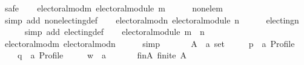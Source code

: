 \begin{isabellebody}
\ {\isacharparenleft}{\kern0pt}safe{\isacharparenright}{\kern0pt}\isanewline
\ \ \isamarkupfalse%
\ electoral{\isacharunderscore}{\kern0pt}mod{\isacharunderscore}{\kern0pt}m{\isacharcolon}{\kern0pt}\ {\isachardoublequoteopen}electoral{\isacharunderscore}{\kern0pt}module\ m{\isachardoublequoteclose}\isanewline
\ \ \ \ \isamarkupfalse%
\ non{\isacharunderscore}{\kern0pt}ele{\isacharunderscore}{\kern0pt}m\isanewline
\ \ \ \ \isamarkupfalse%
\ {\isacharparenleft}{\kern0pt}simp\ add{\isacharcolon}{\kern0pt}\ non{\isacharunderscore}{\kern0pt}electing{\isacharunderscore}{\kern0pt}def{\isacharparenright}{\kern0pt}\isanewline
\ \ \isamarkupfalse%
\ electoral{\isacharunderscore}{\kern0pt}mod{\isacharunderscore}{\kern0pt}n{\isacharcolon}{\kern0pt}\ {\isachardoublequoteopen}electoral{\isacharunderscore}{\kern0pt}module\ n{\isachardoublequoteclose}\isanewline
\ \ \ \ \isamarkupfalse%
\ electing{\isacharunderscore}{\kern0pt}n\isanewline
\ \ \ \ \isamarkupfalse%
\ {\isacharparenleft}{\kern0pt}simp\ add{\isacharcolon}{\kern0pt}\ electing{\isacharunderscore}{\kern0pt}def{\isacharparenright}{\kern0pt}\isanewline
\ \ \isamarkupfalse%
\ {\isachardoublequoteopen}electoral{\isacharunderscore}{\kern0pt}module\ {\isacharparenleft}{\kern0pt}m\ {\isasymtriangleright}\ n{\isacharparenright}{\kern0pt}{\isachardoublequoteclose}\isanewline
\ \ \ \ \isamarkupfalse%
\ electoral{\isacharunderscore}{\kern0pt}mod{\isacharunderscore}{\kern0pt}m\ electoral{\isacharunderscore}{\kern0pt}mod{\isacharunderscore}{\kern0pt}n\isanewline
\ \ \ \ \isamarkupfalse%
\ simp\isanewline
{}\isamarkupfalse%
\isanewline
\ \ \isamarkupfalse%
\isanewline
\ \ \ \ A\ {\isacharcolon}{\kern0pt}{\isacharcolon}{\kern0pt}\ {\isachardoublequoteopen}{\isacharprime}{\kern0pt}a\ set{\isachardoublequoteclose}\ \isanewline
\ \ \ \ p\ {\isacharcolon}{\kern0pt}{\isacharcolon}{\kern0pt}\ {\isachardoublequoteopen}{\isacharprime}{\kern0pt}a\ Profile{\isachardoublequoteclose}\ \isanewline
\ \ \ \ q\ {\isacharcolon}{\kern0pt}{\isacharcolon}{\kern0pt}\ {\isachardoublequoteopen}{\isacharprime}{\kern0pt}a\ Profile{\isachardoublequoteclose}\ \isanewline
\ \ \ \ w\ {\isacharcolon}{\kern0pt}{\isacharcolon}{\kern0pt}\ {\isachardoublequoteopen}{\isacharprime}{\kern0pt}a{\isachardoublequoteclose}\isanewline
\ \ \isamarkupfalse%
\isanewline
\ \ \ \ fin{\isacharunderscore}{\kern0pt}A{\isacharcolon}{\kern0pt}\ {\isachardoublequoteopen}finite\ A{\isachardoublequoteclose}\ \isanewline

\end{isabellebody}

